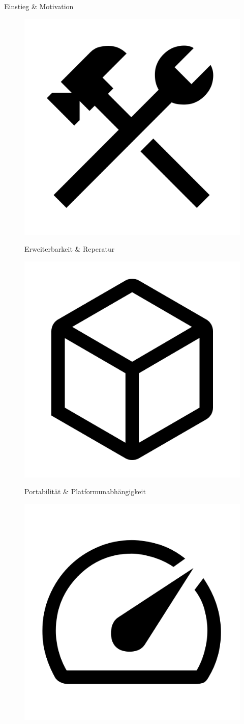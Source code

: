 \begin{frame}{Einstieg \& Motivation}
	\begin{figure}[h]
		\begin{minipage}{.32\textwidth}
			\begin{center}
				\centering
				\centerline{\includegraphics[width=.5\textwidth]{assets/google_icon_construction.png}}
				{\small Erweiterbarkeit \& Reperatur}
			\end{center}
		\end{minipage}
		\hfill
		\begin{minipage}{.32\textwidth}
			\begin{center}
				\centerline{\includegraphics[width=.5\textwidth]{assets/google_icon_deployed_code.png}}
				{\small Portabilität \& Platformunabhängigkeit}
			\end{center}
		\end{minipage}
		\hfill
		\begin{minipage}{.32\textwidth}
			\begin{center}
				\centerline{\includegraphics[width=.5\textwidth]{assets/google_icon_speed.png}}

\end{center}
\end{minipage}
\end{figure}
\end{frame}
